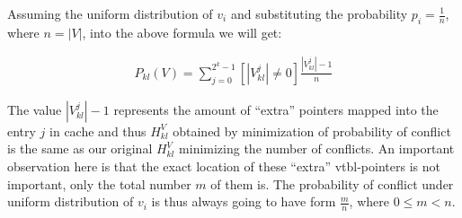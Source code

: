 Assuming the uniform distribution of $v_i$ and substituting the probability 
$p_i=\frac{1}{n}$, where $n=|V|$, into the above formula we will get:

\begin{eqnarray*}
P_{kl}(V)=\sum\limits_{j=0}^{2^k-1}[|V^j_{kl}| \neq 0]\frac{|V^j_{kl}|-1}{n}
\end{eqnarray*}

\noindent
The value $|V^j_{kl}|-1$ represents the amount of ``extra'' pointers mapped into 
the entry $j$ in cache and thus $H_{kl}^V$ obtained by minimization of 
probability of conflict is the same as our original $H_{kl}^V$ minimizing the 
number of conflicts. An important observation here is that the exact location of 
these ``extra'' vtbl-pointers is not important, only the total number $m$ of 
them is. The probability of conflict under uniform distribution of $v_i$ is thus 
always going to have form $\frac{m}{n}$, where $0 \le m < n$.




